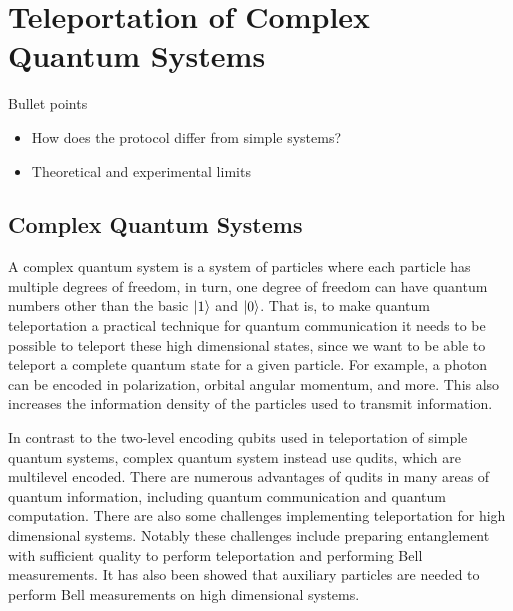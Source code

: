 \section{Teleportation of Complex Quantum Systems}
\begin{mybox}{Bullet points}
    \begin{itemize}
        \item How does the protocol differ from simple systems?
        \item Theoretical and experimental limits
    \end{itemize}
\end{mybox}

\subsection{Complex Quantum Systems}
A complex quantum system is a system of particles where each particle has multiple degrees of freedom, in turn, one degree of freedom can have quantum numbers other than the basic $\ket{1}$ and $\ket{0}$. That is, to make quantum teleportation a practical technique for quantum communication it needs to be possible to teleport these high dimensional states, since we want to be able to teleport a complete quantum state for a given particle. For example, a photon can be encoded in polarization, orbital angular momentum, and more. This also increases the information density of the particles used to transmit information. \cite{Hu:2023}

In contrast to the two-level encoding qubits used in teleportation of simple quantum systems, complex quantum system instead use qudits, which are multilevel encoded. There are numerous advantages of qudits in many areas of quantum information, including quantum communication and quantum computation. There are also some challenges implementing teleportation for high dimensional systems. Notably these challenges include preparing entanglement with sufficient quality to perform teleportation and performing Bell measurements. It has also been showed that auxiliary particles are needed to perform Bell measurements on high dimensional systems. \cite{Hu:2023}